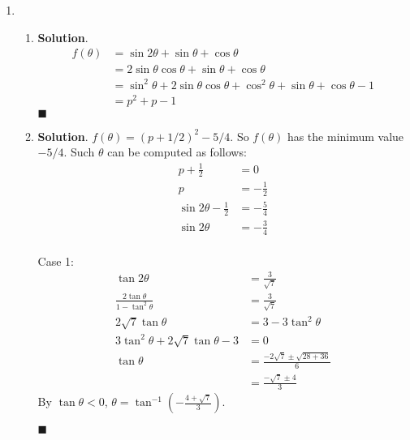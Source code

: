 \documentclass[12pt]{article}
\newenvironment*{sol}{\par \textbf{Solution}.}{\hfill$\blacksquare$}
\begin{document}
\begin{enumerate}
\begin{enumerate}
\begin{sol}
                In conclusion, the set of solution to the equation is $\{\pi/3,\pi/2,\pi,3\pi/2,5\pi/3\}$.
            \end{sol}
            \item \begin{enumerate}
                \item \begin{sol}
                    \begin{align*}
                        f(\theta)&=\sin{2\theta}+\sin{\theta}+\cos{\theta}\\
                        &=2\sin{\theta}\cos{\theta}+\sin{\theta}+\cos{\theta}\\
                        &=\sin^2{\theta}+2\sin{\theta}\cos{\theta}+\cos^2{\theta}+\sin{\theta}+\cos{\theta}-1\\
                        &=p^2+p-1
                    \end{align*}
                \end{sol}
                \item \begin{sol}
                    $f(\theta)=(p+1/2)^2-5/4$. So $f(\theta)$ has the minimum value $-5/4$. Such $\theta$ can be computed as follows:\begin{align*}
                        p+\frac{1}{2}&=0\\
                        p&=-\frac{1}{2}\\
                        \sin{2\theta}-\frac{1}{2}&=-\frac{5}{4}\\
                        \sin{2\theta}&=-\frac{3}{4}\\
                    \end{align*}

                    Case 1:
                    \begin{align*}
                        \tan{2\theta}&=\frac{3}{\sqrt{7}}\\
                        \frac{2\tan{\theta}}{1-\tan^2{\theta}}&=\frac{3}{\sqrt{7}}\\
                        2\sqrt{7}\tan{\theta}&=3-3\tan^2{\theta}\\
                        3\tan^2{\theta}+2\sqrt{7}\tan{\theta}-3&=0\\
                        \tan{\theta}&=\frac{-2\sqrt{7}\pm\sqrt{28+36}}{6}\\
                        &=\frac{-\sqrt{7}\pm 4}{3}
                    \end{align*}
                    By $\tan{\theta}<0$, $\theta=\tan^{-1}(-\frac{4+\sqrt{7}}{3})$.


\end{sol}
\end{enumerate}
\end{enumerate}
\end{enumerate}
\end{document}
